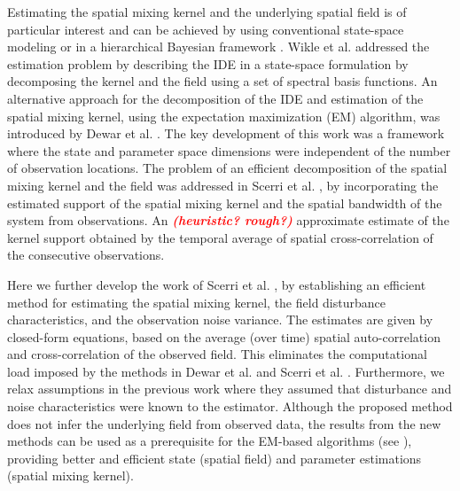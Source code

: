 \documentclass[10pt,twocolumn,twoside]{IEEEtran}
\newcommand{\dean}[1]{\textsf{\emph{\textbf{\textcolor{red}{#1}}}}}
\begin{document}
Estimating the spatial mixing kernel and the underlying spatial field is of particular interest and can be achieved by using conventional state-space modeling \cite{Dewar2009,Scerri2009} or in a hierarchical Bayesian framework \cite{Wikle1999,Xu2005,Wikle2011}. Wikle et al. \cite{Wikle2004} addressed the estimation problem by describing the IDE in a state-space formulation by decomposing the kernel and the field using a set of spectral basis functions. An alternative approach for the decomposition of the IDE and estimation of the spatial mixing kernel, using the expectation maximization (EM) algorithm, was introduced by Dewar et al. \cite{Dewar2009}. The key development of this work was a framework where the state and parameter space dimensions were independent of the number of observation locations. %
The problem of an efficient decomposition of the spatial mixing kernel and the field was addressed in Scerri et al. \cite{Scerri2009}, by incorporating the estimated support of the spatial mixing kernel and the spatial bandwidth of the system from observations. 
An \dean{(heuristic? rough?)} approximate estimate of the kernel support obtained by the temporal average of spatial cross-correlation of the consecutive observations.  

Here we further develop the work of Scerri et al. \cite{Scerri2009}, by establishing an efficient method for estimating the spatial mixing kernel, the field disturbance characteristics, and the observation noise variance. The estimates are given by closed-form equations, based on the average (over time) spatial auto-correlation and cross-correlation of the observed field. This eliminates the computational load imposed by the methods in Dewar et al. and Scerri et al. \cite{Dewar2009,Scerri2009}. Furthermore, we relax assumptions in the previous work where they assumed that disturbance and noise characteristics were known to the estimator. Although the proposed method does not infer the underlying field from observed data, the results from the new methods can be used as a prerequisite for the EM-based algorithms (see \cite{Dewar2009,Xu2007}), providing better and efficient state (spatial field) and parameter estimations (spatial mixing kernel). 
\end{document}
